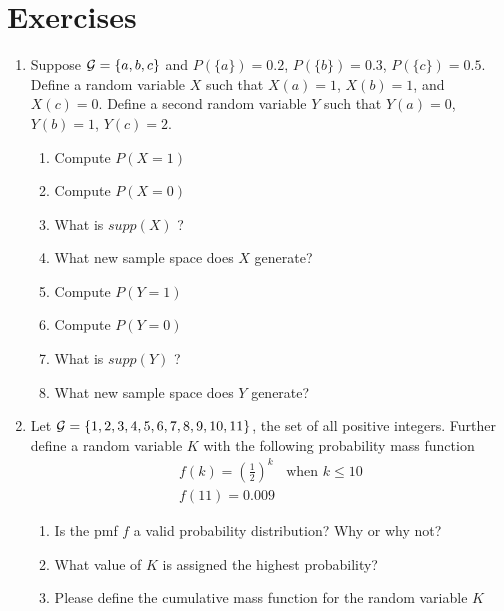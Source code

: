 \section{Exercises}

\begin{enumerate}
    \item Suppose $\mathcal{G} = \{ a,b,c \}$ and $P(\{a\})=0.2$, $P(\{b\})=0.3$, $P(\{c\})=0.5$. Define a random variable $X$ such that $X(a)=1$, $X(b)=1$, and $X(c)=0$.
    Define a second random variable $Y$ such that $Y(a)=0$, $Y(b) = 1$, $Y(c)=2$.
    \begin{enumerate}
        \item Compute $P(X=1)$
        \item Compute $P(X=0)$
        \item What is $supp(X)$ ? 
        \item What new sample space does $X$ generate?
        \item Compute $P(Y=1)$
        \item Compute $P(Y=0)$
        \item What is $supp(Y)$ ? 
        \item What new sample space does $Y$ generate?
    \end{enumerate}
    \item Let $\mathcal{G} = \{1,2,3,4,5,6,7,8,9,10,11\}$, the set of all positive integers. Further define a random variable $K$ with the following probability mass function 
    \begin{align*}
        f(k) = \left( \frac{1}{2} \right) ^{k} & \text{when } k \leq 10\\
        f(11) = 0.009
    \end{align*} 
    \begin{enumerate}
        \item Is the pmf $f$ a valid probability distribution? Why or why not?
        \item What value of $K$ is assigned the highest probability? 
        \item Please define the cumulative mass function for the random variable $K$
    \end{enumerate}
    

\end{enumerate}
